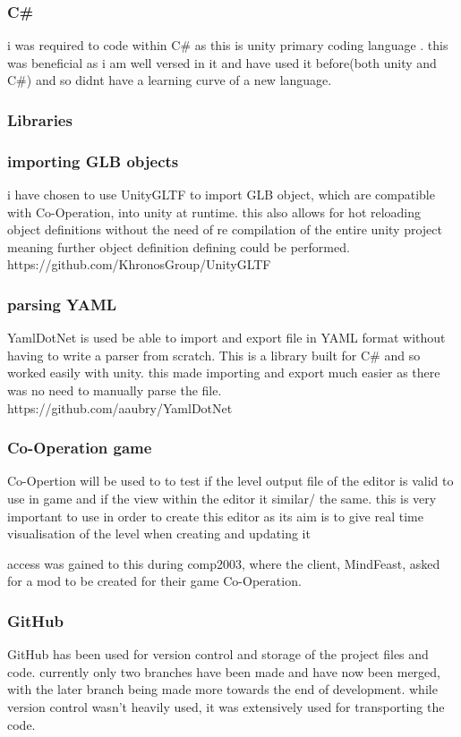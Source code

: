 \subsubsection{C\#}
i was required to code within C\# as this is unity primary coding language . this was beneficial as i am well versed in it and have used it before(both unity and C\#) and so didnt have a learning curve of a new language.

\subsubsection{Libraries}
\subsubsection*{importing GLB objects}
i have chosen to use UnityGLTF to import GLB object, which are compatible with Co-Operation, into unity at runtime. this also allows for hot reloading object definitions without the need of re compilation of the entire unity project meaning further object definition defining could be performed.\\
https://github.com/KhronosGroup/UnityGLTF
\subsubsection*{parsing YAML}
YamlDotNet is used be able to import and export file in YAML format without having to write a parser from scratch. This is a library built for C\# and so worked easily with unity. this made importing and export much easier as there was no need to manually parse the file.\\
https://github.com/aaubry/YamlDotNet 
\subsubsection{Co-Operation game}
Co-Opertion will be used to to test if the level output file of the editor is valid to use in game and if the view within the editor it similar/ the same. this is very important to use in order to create this editor as its aim is to give real time visualisation of the level when creating and updating it

access was gained to this during comp2003, where the client, MindFeast, asked for a mod to be created for their game Co-Operation.
\subsubsection{GitHub}
GitHub has been used for version control and storage of the project files and code. currently only two branches have been made and have now been merged, with the later branch being made more towards the end of development. while version control wasn't heavily used, it was extensively used for transporting the code.

